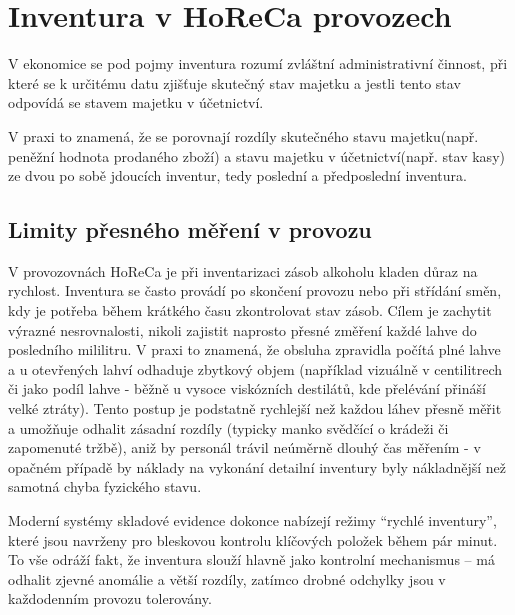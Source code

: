 \chapter{Inventura v HoReCa provozech}
\label{inventura}

V ekonomice se pod pojmy inventura rozumí zvláštní administrativní činnost, při které se k určitému datu zjišťuje skutečný stav majetku a jestli tento stav odpovídá se stavem majetku v účetnictví. 
\cite{Zákon o účetnictví}

V praxi to znamená, že se porovnají rozdíly skutečného stavu majetku(např. peněžní hodnota prodaného zboží) a stavu majetku v účetnictví(např. stav kasy) ze dvou po sobě jdoucích inventur, tedy poslední a předposlední inventura.

\section{Limity přesného měření v provozu}

V provozovnách HoReCa je při inventarizaci zásob alkoholu kladen důraz na rychlost. Inventura se často provádí po skončení provozu nebo při střídání směn, kdy je potřeba během krátkého času zkontrolovat stav zásob. Cílem je zachytit výrazné nesrovnalosti, nikoli zajistit naprosto přesné změření každé lahve do posledního mililitru. V praxi to znamená, že obsluha zpravidla počítá plné lahve a u otevřených lahví odhaduje zbytkový objem (například vizuálně v centilitrech či jako podíl lahve - běžně u vysoce viskózních destilátů, kde přelévání přináší velké ztráty). Tento postup je podstatně rychlejší než každou láhev přesně měřit a umožňuje odhalit zásadní rozdíly (typicky manko svědčící o krádeži či zapomenuté tržbě), aniž by personál trávil neúměrně dlouhý čas měřením - v opačném případě by náklady na vykonání detailní inventury byly nákladnější než samotná chyba fyzického stavu.

Moderní systémy skladové evidence dokonce nabízejí režimy “rychlé inventury”, které jsou navrženy pro bleskovou kontrolu klíčových položek během pár minut. To vše odráží fakt, že inventura slouží hlavně jako kontrolní mechanismus – má odhalit zjevné anomálie a větší rozdíly, zatímco drobné odchylky jsou v každodenním provozu tolerovány.
	
